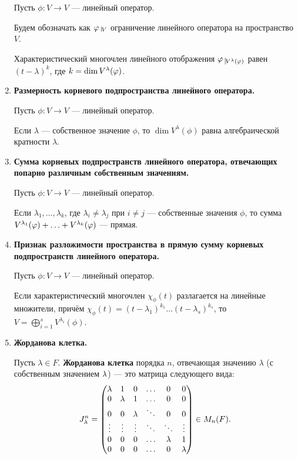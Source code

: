\begin{enumerate}
Пусть $\phi\colon V \rightarrow V$ --- линейный оператор.

Будем обозначать как $\phi \; \vline_{V}$ ограничение линейного оператора на пространство $V$.

Характеристический многочлен линейного отображения $\phi \; \vline_{V^{\lambda}(\phi)}$ равен $(t - \lambda)^{k}$, где $k \hm= \dim V^\l (\phi)$.

\item \textbf{Размерность корневого подпространства линейного оператора.}

Пусть $\phi\colon V \rightarrow V$ --- линейный оператор.

Если $\lambda$ --- собственное значение $\phi$, то $\dim{V^{\lambda}(\phi)}$ равна алгебраической кратности $\lambda$.

\item \textbf{Сумма корневых подпространств линейного оператора, отвечающих попарно различным собственным значениям.}

Пусть $\phi\colon V \rightarrow V$ --- линейный оператор.

Если $\lambda_1, \ldots, \lambda_k$, где $\lambda_i \neq \lambda_j$ при $i \neq j$ --- собственные значения $\phi$, то сумма $V^{\lambda_1}(\phi) + \ldots \hm+ V^{\lambda_k}(\phi)$ --- прямая.

\item \textbf{Признак разложимости пространства в прямую сумму корневых подпространств линейного оператора.}

Пусть $\phi\colon V \rightarrow V$ --- линейный оператор.

Если характеристический многочлен $\chi_\phi(t)$ разлагается на линейные множители, причём $\chi_\phi(t) = (t - \lambda_1)^{k_1}\ldots(t - \lambda_s)^{k_s}$, то $V = \bigoplus_{i = 1}^s  V^{\lambda_i}(\phi)$.

\item \textbf{Жорданова клетка.}

Пусть $\lambda \in F$. \textbf{Жорданова клетка} порядка $n$, отвечающая значению $\lambda$ (с собственным значением $\lambda $) --- это матрица следующего вида:
\begin{gather*}
J_\lambda^n = 
\begin{pmatrix}
\lambda & 1 & 0 & \ldots & 0 & 0 \\
0 & \lambda & 1 & \ldots & 0 & 0 \\
0 & 0 & \lambda & \ddots & 0 & 0 \\
\vdots & \vdots & \vdots & \ddots & \ddots & \vdots \\
0 & 0 & 0 & \ldots & \lambda & 1 \\
0 & 0 & 0 & \ldots & 0 & \lambda
\end{pmatrix} \in M_n(F).
\end{gather*}


\end{enumerate}
